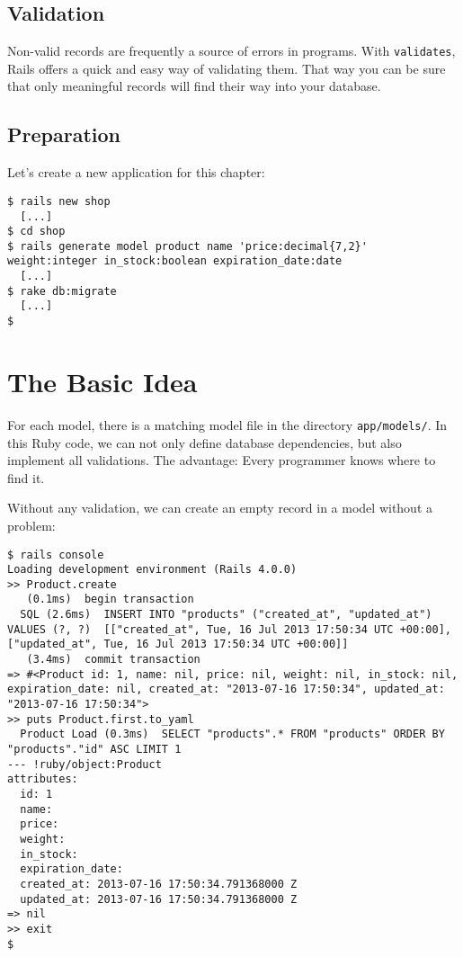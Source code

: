 \documentclass[a4paper]{book}
\newcounter{tab}[chapter]
\newcommand{\chap}[1]{\newpage\thispagestyle{empty}\chapter{#1}\label{chap:\thechapter}}
\begin{document}
\section{Validation}\label{validation}

Non-valid records are frequently a source of errors in programs. With \texttt{validates}, Rails offers a quick and easy way of validating them. That way you can be sure that only meaningful records will find their way into your database.

\section{Preparation}\label{preparation-3}

Let's create a new application for this chapter:

\begin{shaded}\begin{verbatim}
$ rails new shop
  [...]
$ cd shop
$ rails generate model product name 'price:decimal{7,2}' weight:integer in_stock:boolean expiration_date:date
  [...]
$ rake db:migrate
  [...]
$
\end{verbatim}\end{shaded}

\chap{The Basic Idea}\label{the-basic-idea}

For each model, there is a matching model file in the directory \texttt{app/models/}. In this Ruby code, we can not only define database dependencies, but also implement all validations. The advantage: Every programmer knows where to find it.

Without any validation, we can create an empty record in a model without a problem:

\begin{shaded}\begin{verbatim}
$ rails console
Loading development environment (Rails 4.0.0)
>> Product.create
   (0.1ms)  begin transaction
  SQL (2.6ms)  INSERT INTO "products" ("created_at", "updated_at") VALUES (?, ?)  [["created_at", Tue, 16 Jul 2013 17:50:34 UTC +00:00], ["updated_at", Tue, 16 Jul 2013 17:50:34 UTC +00:00]]
   (3.4ms)  commit transaction
=> #<Product id: 1, name: nil, price: nil, weight: nil, in_stock: nil, expiration_date: nil, created_at: "2013-07-16 17:50:34", updated_at: "2013-07-16 17:50:34">
>> puts Product.first.to_yaml
  Product Load (0.3ms)  SELECT "products".* FROM "products" ORDER BY "products"."id" ASC LIMIT 1
--- !ruby/object:Product
attributes:
  id: 1
  name:
  price:
  weight:
  in_stock:
  expiration_date:
  created_at: 2013-07-16 17:50:34.791368000 Z
  updated_at: 2013-07-16 17:50:34.791368000 Z
=> nil
>> exit
$
\end{verbatim}\end{shaded}
\end{document}
